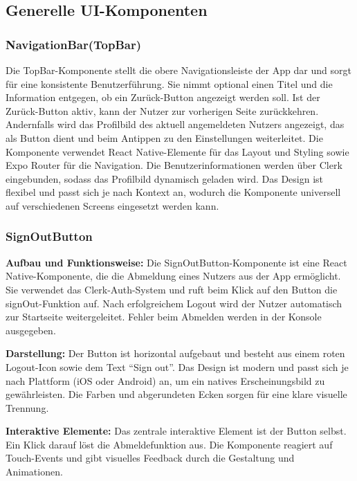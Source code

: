 \subsection{Generelle UI-Komponenten}

\subsubsection{NavigationBar(TopBar)}
Die TopBar-Komponente stellt die obere Navigationsleiste der App dar und sorgt für eine konsistente Benutzerführung. Sie nimmt optional einen Titel und die Information entgegen, ob ein Zurück-Button angezeigt werden soll. Ist der Zurück-Button aktiv, kann der Nutzer zur vorherigen Seite zurückkehren. Andernfalls wird das Profilbild des aktuell angemeldeten Nutzers angezeigt, das als Button dient und beim Antippen zu den Einstellungen weiterleitet. Die Komponente verwendet React Native-Elemente für das Layout und Styling sowie Expo Router für die Navigation. Die Benutzerinformationen werden über Clerk eingebunden, sodass das Profilbild dynamisch geladen wird. Das Design ist flexibel und passt sich je nach Kontext an, wodurch die Komponente universell auf verschiedenen Screens eingesetzt werden kann.

\subsubsection{SignOutButton}

\noindent\textbf{Aufbau und Funktionsweise:}
Die SignOutButton-Komponente ist eine React Native-Komponente, die die Abmeldung eines Nutzers aus der App ermöglicht. Sie verwendet das Clerk-Auth-System und ruft beim Klick auf den Button die signOut-Funktion auf. Nach erfolgreichem Logout wird der Nutzer automatisch zur Startseite weitergeleitet. Fehler beim Abmelden werden in der Konsole ausgegeben.

\noindent\textbf{Darstellung:}
Der Button ist horizontal aufgebaut und besteht aus einem roten Logout-Icon sowie dem Text \enquote{Sign out}. Das Design ist modern und passt sich je nach Plattform (iOS oder Android) an, um ein natives Erscheinungsbild zu gewährleisten. Die Farben und abgerundeten Ecken sorgen für eine klare visuelle Trennung.

\noindent\textbf{Interaktive Elemente:}
Das zentrale interaktive Element ist der Button selbst. Ein Klick darauf löst die Abmeldefunktion aus. Die Komponente reagiert auf Touch-Events und gibt visuelles Feedback durch die Gestaltung und Animationen.

